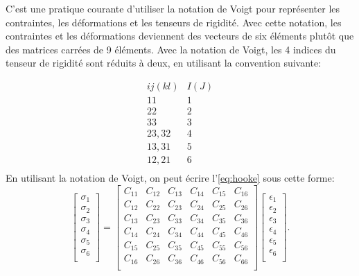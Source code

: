 C’est une pratique courante d’utiliser la notation de Voigt pour représenter les
contraintes, les déformations et les tenseurs de rigidité. Avec cette notation,
les contraintes et les déformations deviennent des vecteurs de six éléments
plutôt que des matrices carrées de 9 éléments. Avec la notation de Voigt, les 4
indices du tenseur de rigidité sont réduits à deux, en utilisant la convention
suivante:\par
$$\begin{matrix}
ij(kl) & I(J)\\
 11 & 1 \\
 22 & 2 \\
 33 & 3 \\
 23, 32 & 4 \\
 13, 31 & 5 \\
 12, 21 & 6 \\
\end{matrix}$$
En utilisant la notation de Voigt, on peut écrire l’\cref{eq:hooke} sous cette
forme:
\[
    \begin{bmatrix}
        \sigma_{1} \\
        \sigma_{2} \\
        \sigma_{3} \\
        \sigma_{4} \\
        \sigma_{5} \\
        \sigma_{6} \\
    \end{bmatrix}
    =
    \begin{bmatrix}
        C_{11} & C_{12} & C_{13} & C_{14} & C_{15} & C_{16} \\
        C_{12} & C_{22} & C_{23} & C_{24} & C_{25} & C_{26} \\
        C_{13} & C_{23} & C_{33} & C_{34} & C_{35} & C_{36} \\
        C_{14} & C_{24} & C_{34} & C_{44} & C_{45} & C_{46} \\
        C_{15} & C_{25} & C_{35} & C_{45} & C_{55} & C_{56} \\
        C_{16} & C_{26} & C_{36} & C_{46} & C_{56} & C_{66} \\
    \end{bmatrix}
    \begin{bmatrix}
        \epsilon_{1} \\
        \epsilon_{2} \\
        \epsilon_{3} \\
        \epsilon_{4} \\
        \epsilon_{5} \\
        \epsilon_{6} \\
    \end{bmatrix}
.\]
